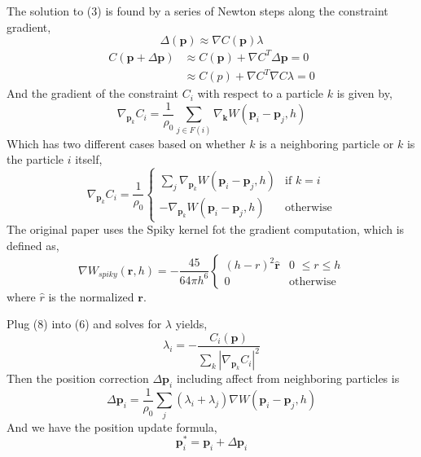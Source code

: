 \documentclass[sigconf]{acmart}
\newcommand{\vect}[1]{\boldsymbol{#1}}
\begin{document}
The solution to (3) is found by a series of Newton steps along the constraint gradient,
\begin{equation}
  \Delta(\vect{p}) \approx \nabla C(\vect{p})\lambda
\end{equation}
\begin{align*}
  C(\vect{p} + \Delta \vect{\vect{p}}) &\approx C(\vect{p}) + \nabla C^T \Delta \vect{\vect{p}} = 0 \tag*{(5)}\\
  &\approx C(p) + \nabla C^T \nabla C \lambda = 0 \tag*{(6)}
\end{align*}
And the gradient of the constraint $C_i$ with respect to a particle $k$ is given by,
\begin{equation}
  \nabla_{\vect{p}_k}C_i = \frac{1}{\rho_0}\sum_{j \in F(i)} \nabla_{\vect{k}}W(\vect{p}_i-\vect{p}_j, h) \tag*{(7)}
\end{equation}
Which has two different cases based on whether $k$ is a neighboring particle or $k$ is the particle $i$ itself,
\begin{equation*}
  \nabla_{\vect{p}_k}C_i = \frac{1}{\rho_0} 
  \begin{cases}
    \sum_{j} \nabla_{\vect{p}_k}W(\vect{p}_i-\vect{p}_j, h) &\text{if $k=i$}\\
    - \nabla_{\vect{p}_k}W(\vect{p}_i-\vect{p}_j, h) &\text{otherwise}
  \end{cases}
  \tag*{(8)}
\end{equation*}
The original paper uses the Spiky kernel fot the gradient computation, which is defined as,
\begin{equation*}
  \nabla W_{spiky}(\vect{r}, h) = -\frac{45}{64 \pi h^6}
  \begin{cases}
    (h - r)^2 \hat{\vect{r}} &\text{0 $\leq r \leq h$} \\
    0 &\text{otherwise}
  \end{cases}
\end{equation*}
where $\hat{r}$ is the normalized $\vect{r}$.

Plug (8) into (6) and solves for $\lambda$ yields,
\begin{equation}
  \lambda_i = -\frac{C_i(\vect{p})}{\sum_k |\nabla_{\vect{p}_k} C_i|^2} \tag*{(9)}
\end{equation}
Then the position correction $\Delta \vect{p}_i$ including affect from neighboring particles is
\begin{equation}
  \Delta \vect{p}_i = \frac{1}{\rho_0} \sum_j (\lambda_i + \lambda_j) \nabla W(\vect{p}_i - \vect{p}_j , h) \tag*{(12)}
\end{equation}
And we have the position update formula,
\begin{equation}
  \vect{p}_i^* = \vect{p}_i + \Delta \vect{p}_i \tag*{(13)}
\end{equation}
\end{document}
